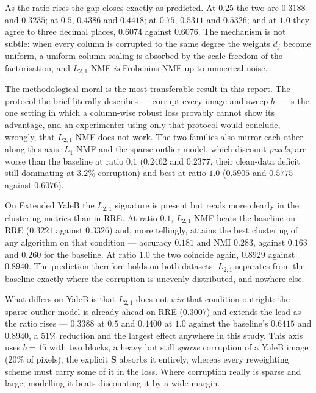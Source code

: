 \documentclass[12pt,a4paper]{article}
\newcommand{\bS}{\bm{S}}
\begin{document}
As the ratio rises the gap closes exactly as predicted. At $0.25$ the two are
$0.3188$ and $0.3235$; at $0.5$, $0.4386$ and $0.4418$; at $0.75$, $0.5311$ and
$0.5326$; and at $1.0$ they agree to three decimal places, $0.6074$ against
$0.6076$. The mechanism is not subtle: when every column is corrupted to the
same degree the weights $d_j$ become uniform, a uniform column scaling is
absorbed by the scale freedom of the factorisation, and $L_{2,1}$-NMF
\emph{is} Frobenius NMF up to numerical noise.

The methodological moral is the most transferable result in this report. The
protocol the brief literally describes --- corrupt every image and sweep $b$
--- is the one setting in which a column-wise robust loss provably cannot show
its advantage, and an experimenter using only that protocol would conclude,
wrongly, that $L_{2,1}$-NMF does not work. The two families also mirror each
other along this axis: $L_1$-NMF and the sparse-outlier model, which discount
\emph{pixels}, are worse than the baseline at ratio $0.1$ ($0.2462$ and
$0.2377$, their clean-data deficit still dominating at $3.2\%$ corruption) and
best at ratio $1.0$ ($0.5905$ and $0.5775$ against $0.6076$).

On Extended YaleB the $L_{2,1}$ signature is present but reads more clearly in
the clustering metrics than in RRE. At ratio $0.1$, $L_{2,1}$-NMF beats the
baseline on RRE ($0.3221$ against $0.3326$) and, more tellingly, attains the
best clustering of any algorithm on that condition --- accuracy $0.181$ and NMI
$0.283$, against $0.163$ and $0.260$ for the baseline. At ratio $1.0$ the two
coincide again, $0.8929$ against $0.8940$. The prediction therefore holds on
both datasets: $L_{2,1}$ separates from the baseline exactly where the
corruption is unevenly distributed, and nowhere else.

What differs on YaleB is that $L_{2,1}$ does not \emph{win} that condition
outright: the sparse-outlier model is already ahead on RRE ($0.3007$) and
extends the lead as the ratio rises --- $0.3388$ at $0.5$ and $0.4400$ at $1.0$
against the baseline's $0.6415$ and $0.8940$, a $51\%$ reduction and the
largest effect anywhere in this study. This axis uses $b=15$ with two blocks, a
heavy but still \emph{sparse} corruption of a YaleB image ($20\%$ of pixels);
the explicit $\bS$ absorbs it entirely, whereas every reweighting scheme must
carry some of it in the loss. Where corruption really is sparse and large,
modelling it beats discounting it by a wide margin.
\end{document}
